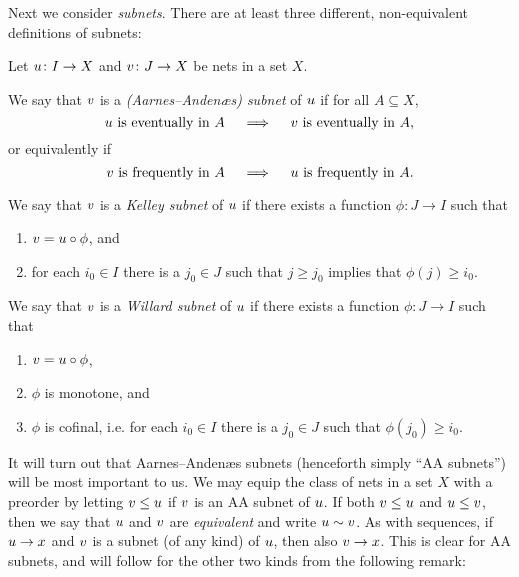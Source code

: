 \documentclass[article, a4paper, 11pt, oneside]{memoir}
\numberwithin{equation}{chapter}
\theoremstyle{nonumberplain}
\begin{document}
Next we consider \emph{subnets}. There are at least three different, non-equivalent definitions of subnets:

\begin{definition}[Subnets]
    \label{def:subnets}
    Let $u \colon I \to X$ and $v \colon J \to X$ be nets in a set $X$.
    
    \begin{enumdef}
        \item \label{enum:AA-subnet} We say that $v$ is a \emph{(Aarnes--Andenæs) subnet} of $u$ if for all $A \subseteq X$,
        \begin{equation*}
            \text{$u$ is eventually in $A$}
            \quad \implies \quad
            \text{$v$ is eventually in $A$},
        \end{equation*}
        or equivalently if
        \begin{equation*}
            \text{$v$ is frequently in $A$}
            \quad \implies \quad
            \text{$u$ is frequently in $A$}.
        \end{equation*}

        \item \label{enum:Kelley-subnet} We say that $v$ is a \emph{Kelley subnet} of $u$ if there exists a function $\phi \colon J \to I$ such that
        \begin{enumerate}
            \item $v = u \circ \phi$, and
            \item for each $i_0 \in I$ there is a $j_0 \in J$ such that $j \geq j_0$ implies that $\phi(j) \geq i_0$.
        \end{enumerate}

        \item \label{enum:Willard-subnet} We say that $v$ is a \emph{Willard subnet} of $u$ if there exists a function $\phi \colon J \to I$ such that
        \begin{enumerate}
            \item $v = u \circ \phi$,
            \item $\phi$ is monotone, and
            \item $\phi$ is cofinal, i.e. for each $i_0 \in I$ there is a $j_0 \in J$ such that $\phi(j_0) \geq i_0$.
        \end{enumerate}
    \end{enumdef}
\end{definition}
%
It will turn out that Aarnes--Andenæs subnets (henceforth simply \enquote{AA subnets}) will be most important to us. We may equip the class of nets in a set $X$ with a preorder by letting $v \leq u$ if $v$ is an AA subnet of $u$. If both $v \leq u$ and $u \leq v$, then we say that $u$ and $v$ are \emph{equivalent} and write $u \sim v$. As with sequences, if $u \to x$ and $v$ is a subnet (of any kind) of $u$, then also $v \to x$. This is clear for AA subnets, and will follow for the other two kinds from the following remark:
\end{document}
